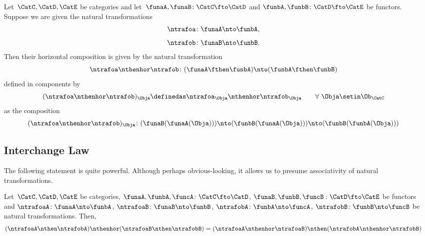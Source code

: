 \begin{ctdefinition}
    \label{def:horizontal-composition}
    Let~$\CatC, \CatD, \CatE$ be categories and let~$\funaA,\funaB\colon\CatC \fto \CatD$ and $\funbA,\funbB\colon \CatD \fto \CatE$ be functors.
    Suppose we are given the natural transformations
    \begin{equation}
        \ntrafoa \colon \funaA \nto \funbA,
    \end{equation}
    \begin{equation}
        \ntrafob \colon \funaB \nto \funbB.
    \end{equation}
    Then their horizontal composition is given by the natural transformation
    \begin{equation}
        \ntrafoa \nthenhor \ntrafob\colon (\funaA \fthen \funbA) \nto (\funbA \fthen \funbB)
    \end{equation}
    defined in components by
    \begin{equation}
        (\ntrafoa \nthenhor \ntrafob)_{\Obja} \definedas \ntrafoa_{\Obja} \nthenhor \ntrafob_{\Obja} \quad \quad \forall \ \Obja \setin \Ob_\CatC
    \end{equation}
    as the composition
    \begin{equation}
        (\ntrafoa \nthenhor \ntrafob)_{\Obja} \colon (\funaB(\funaA(\Obja))) \nto (\funbB(\funaA(\Obja))) \nto (\funbB(\funbA(\Obja)))
    \end{equation}
\end{ctdefinition}

\subsection{Interchange Law}

The following statement is quite powerful.
Although perhaps obvious-looking, it allows us to presume associativity of
natural transformations.

\begin{proposition}[Interchange]
    Let~$\CatC, \CatD, \CatE$ be categories, $\funaA, \funbA, \funcA\colon\CatC \fto \CatD$, $\funaB, \funbB, \funcB:\CatD \fto \CatE$ be functors and $\ntrafoaA\colon\funaA\nto\funbA$, $\ntrafoaB\colon\funaB\nto\funbB$, $\ntrafobA\colon\funbA\nto\funcA$, $\ntrafobB\colon\funbB\nto\funcB$ be natural transformations.
    Then,
    \begin{equation}
        (\ntrafoaA \nthen \ntrafobA) \nthenhor (\ntrafoaB \nthen \ntrafobB) =
        (\ntrafoaA \nthenhor \ntrafoaB) \nthen (\ntrafobA \nthenhor \ntrafobB)
    \end{equation}
\end{proposition}

